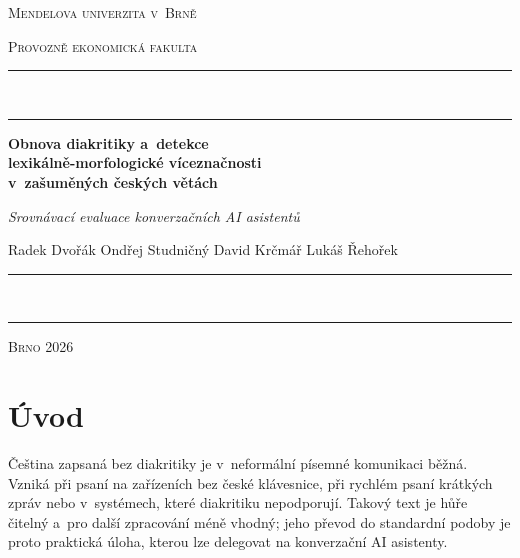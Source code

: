 \documentclass[11pt,a4paper]{article}
\begin{document}
\begin{titlepage}
\centering
{\large\scshape Mendelova univerzita v~Brně\par}
\vspace{0.2em}
{\large\scshape Provozně ekonomická fakulta\par}
\vspace{0.8em}
\rule{\linewidth}{1.2pt}\\[-0.9em]
\rule{\linewidth}{0.4pt}


{\huge\bfseries Obnova diakritiky a~detekce\\[0.2em]
lexikálně-morfologické víceznačnosti\\[0.2em]
v~zašuměných českých větách\par}
\vspace{1em}
{\Large\itshape Srovnávací evaluace konverzačních AI asistentů\par}
\vspace{2.6em}
{\large Radek Dvořák \quad Ondřej Studničný \quad David Krčmář \quad Lukáš Řehořek\par}


\rule{\linewidth}{0.4pt}\\[-0.9em]
\rule{\linewidth}{1.2pt}
\vspace{0.6em}

{\large\scshape Brno 2026\par}
\end{titlepage}

\section{Úvod}
\label{sec:uvod}

Čeština zapsaná bez diakritiky je v~neformální písemné komunikaci běžná.
Vzniká při psaní na zařízeních bez české klávesnice, při rychlém psaní
krátkých zpráv nebo v~systémech, které diakritiku nepodporují. Takový
text je hůře čitelný a~pro další zpracování méně vhodný; jeho převod do
standardní podoby je proto praktická úloha, kterou lze delegovat na
konverzační AI asistenty.
\end{document}
